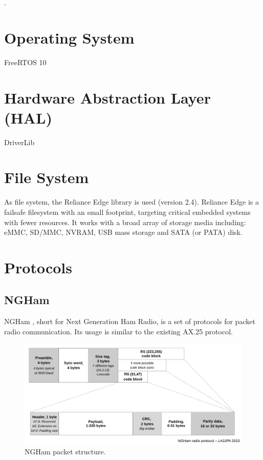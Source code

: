 .

\section{Operating System}

FreeRTOS 10

\section{Hardware Abstraction Layer (HAL)}

DriverLib

\section{File System}

As file system, the Reliance Edge library is used \cite{reliance_edge} (version 2.4). Reliance Edge is a failsafe filesystem with an small footprint, targeting critical embedded systems with fewer resources. It works with a broad array of storage media including: eMMC, SD/MMC, NVRAM, USB mass storage and SATA (or PATA) disk.

\section{Protocols}

\subsection{NGHam}

NGHam \cite{ngham}, short for Next Generation Ham Radio, is a set of protocols for packet radio communication. Its usage is similar to the existing AX.25 protocol.

\begin{figure}[!ht]
    \begin{center}
        \includegraphics[width=\textwidth]{figures/ngham_block_v4.pdf}
        \caption{NGHam packet structure.}
        \label{fig:ngham-stack}
    \end{center}
\end{figure}
